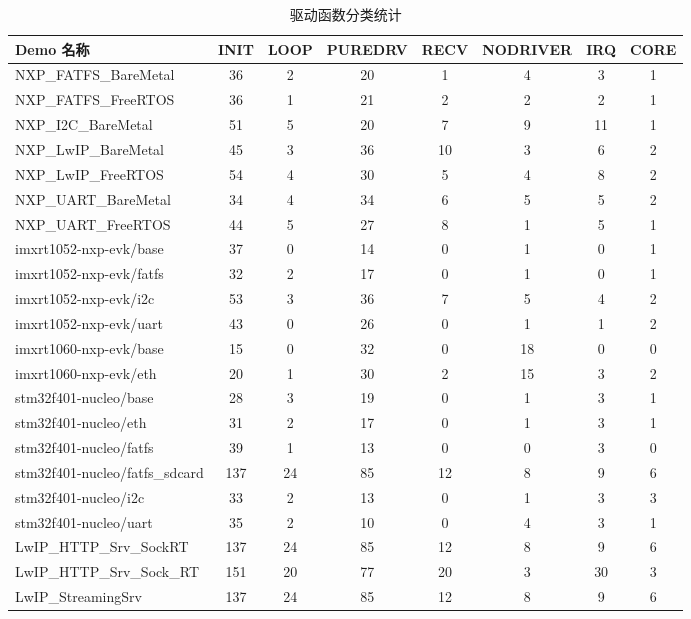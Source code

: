 \begin{table}[H]
\centering
\caption{驱动函数分类统计}
\label{tab:function_categories_stats}
\footnotesize
\begin{adjustbox}{max width=\textwidth}
\begin{tabular}{lccccccc}
\toprule
\textbf{Demo 名称} & \textbf{INIT} & \textbf{LOOP} & \textbf{PUREDRV} & \textbf{RECV} & \textbf{NODRIVER} & \textbf{IRQ} & \textbf{CORE} \\
\midrule
NXP\_FATFS\_BareMetal & 36 & 2 & 20 & 1 & 4 & 3 & 1 \\
NXP\_FATFS\_FreeRTOS & 36 & 1 & 21 & 2 & 2 & 2 & 1 \\
NXP\_I2C\_BareMetal & 51 & 5 & 20 & 7 & 9 & 11 & 1 \\
NXP\_LwIP\_BareMetal & 45 & 3 & 36 & 10 & 3 & 6 & 2 \\
NXP\_LwIP\_FreeRTOS & 54 & 4 & 30 & 5 & 4 & 8 & 2 \\
NXP\_UART\_BareMetal & 34 & 4 & 34 & 6 & 5 & 5 & 2 \\
NXP\_UART\_FreeRTOS & 44 & 5 & 27 & 8 & 1 & 5 & 1 \\
imxrt1052-nxp-evk/base & 37 & 0 & 14 & 0 & 1 & 0 & 1 \\
imxrt1052-nxp-evk/fatfs & 32 & 2 & 17 & 0 & 1 & 0 & 1 \\
imxrt1052-nxp-evk/i2c & 53 & 3 & 36 & 7 & 5 & 4 & 2 \\
imxrt1052-nxp-evk/uart & 43 & 0 & 26 & 0 & 1 & 1 & 2 \\
imxrt1060-nxp-evk/base & 15 & 0 & 32 & 0 & 18 & 0 & 0 \\
imxrt1060-nxp-evk/eth & 20 & 1 & 30 & 2 & 15 & 3 & 2 \\
stm32f401-nucleo/base & 28 & 3 & 19 & 0 & 1 & 3 & 1 \\
stm32f401-nucleo/eth & 31 & 2 & 17 & 0 & 1 & 3 & 1 \\
stm32f401-nucleo/fatfs & 39 & 1 & 13 & 0 & 0 & 3 & 0 \\
stm32f401-nucleo/fatfs\_sdcard & 137 & 24 & 85 & 12 & 8 & 9 & 6 \\
stm32f401-nucleo/i2c & 33 & 2 & 13 & 0 & 1 & 3 & 3 \\
stm32f401-nucleo/uart & 35 & 2 & 10 & 0 & 4 & 3 & 1 \\
LwIP\_HTTP\_Srv\_SockRT & 137 & 24 & 85 & 12 & 8 & 9 & 6 \\
LwIP\_HTTP\_Srv\_Sock\_RT & 151 & 20 & 77 & 20 & 3 & 30 & 3 \\
LwIP\_StreamingSrv & 137 & 24 & 85 & 12 & 8 & 9 & 6 \\

\end{tabular}
\end{adjustbox}
\end{table}
